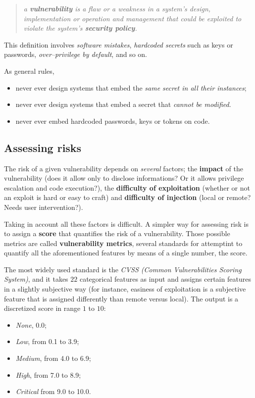 \documentclass[10pt]{extbook}
\begin{document}
\begin{quote}
    \emph{a \textbf{vulnerability} is a flaw or a weakness in a system's
    design, implementation or operation and management that could be exploited
to violate the system's \textbf{security policy}.}
\end{quote}

This definition involves \emph{software mistakes}, \emph{hardcoded secrets}
such as keys or passwords, \emph{over--privilege by default}, and so on.

As general rules,
\begin{itemize}
    \item never ever design systems that embed the \emph{same secret in all
        their instances};
    \item never ever design systems that embed a secret that \emph{cannot be
        modified}.
    \item never ever embed hardcoded passwords, keys or tokens on code.
\end{itemize}

\subsection{Assessing risks}

The risk of a given vulnerability depends on \emph{several} factors; the
\textbf{impact} of the vulnerability (does it allow only to disclose
informations? Or it allows privilege escalation and code execution?), the \textbf{difficulty of exploitation} (whether or not an exploit is hard or easy to craft) and \textbf{difficulty of injection} (local or remote? Needs user intervention?).

Taking in account all these factors is difficult. A simpler way for assessing
risk is to assign a \textbf{score} that quantifies the risk of a vulnerability.
Those possible metrics are called \textbf{vulnerability metrics}, several
standards for attemptint to quantify all the aforementioned features by means
of a single number, the score. 

The most widely used standard is the \emph{CVSS (Common Vulnerabilities Scoring
System)}, and it takes $22$ categorical features as input and assigns certain
features in a slightly subjective way (for instance, easiness of exploitation
is a subjective feature that is assigned differently than remote versus local).
The output is a discretized score in range $1$ to $10$:
\begin{itemize}
    \item \emph{None}, 0.0;
    \item \emph{Low}, from 0.1 to 3.9;
    \item \emph{Medium}, from 4.0 to 6.9;
    \item \emph{High}, from 7.0 to 8.9;
    \item \emph{Critical} from 9.0 to 10.0.
\end{itemize}
\end{document}
